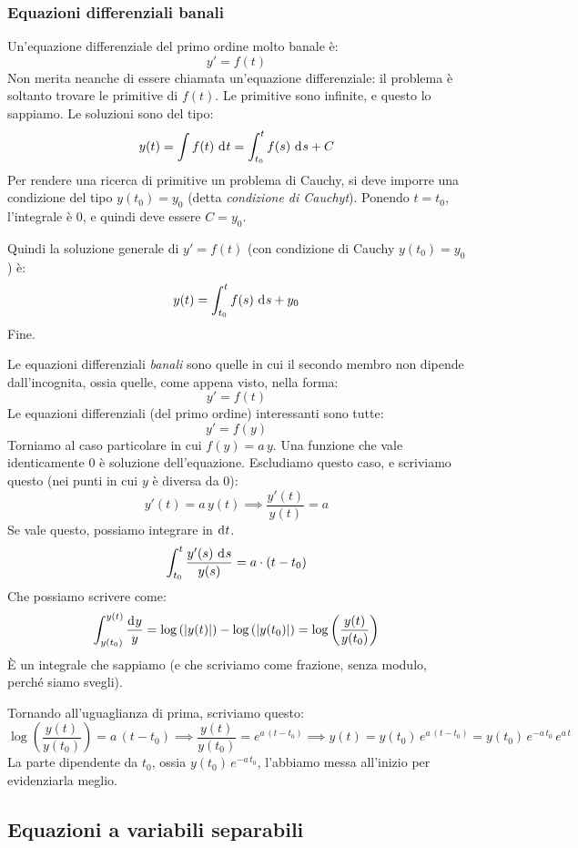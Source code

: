 
\subsubsection{Equazioni differenziali banali}

Un'equazione differenziale del primo ordine molto banale \`e:
\[
y' = f(t)
\]
Non merita neanche di essere chiamata un'equazione differenziale: il problema \`e soltanto trovare le primitive di $f(t)$. Le primitive sono infinite, e questo lo sappiamo. Le soluzioni sono del tipo:
\[
y(t) = \int f(t) \dx[t] = \int_{t_0}^{t} f(s) \dx[s] + C
\]
Per rendere una ricerca di primitive un problema di Cauchy, si deve imporre una condizione del tipo $y(t_0) = y_0$ (detta \emph{condizione di Cauchyt}). Ponendo $t = t_0$, l'integrale \`e 0, e quindi deve essere $C = y_0$. 

Quindi la soluzione generale di $y' = f(t)$ (con condizione di Cauchy $y(t_0) = y_0$) \`e:
\[
y(t) = \int_{t_0}^{t} f(s) \dx[s] + y_0
\]
Fine.

Le equazioni differenziali \emph{banali} sono quelle in cui il secondo membro non dipende dall'incognita, ossia quelle, come appena visto, nella forma:
\[
y' = f(t)
\]
Le equazioni differenziali (del primo ordine) interessanti sono tutte:
\[
y' = f(y)
\]
Torniamo al caso particolare in cui $f(y) = a \, y$. Una funzione che vale identicamente 0 \`e soluzione dell'equazione. Escludiamo questo caso, e scriviamo questo (nei punti in cui $y$ \`e diversa da 0):
\[
y'(t) = a \, y(t) \implies \frac{y'(t)}{y(t)} = a
\]
Se vale questo, possiamo integrare in $\diff t$.
\[
\int_{t_0}^{t} \frac{y'(s) \dx[s]}{y(s)} = a \cdot (t - t_0)
\]
Che possiamo scrivere come:
\[
\int_{y(t_0)}^{y(t)} \frac{\diff y}{y} =
\abslog{y(t)} - \abslog{y(t_0)} =
\log \left( \frac{y(t)}{y(t_0)} \right)
\]
\`E un integrale che sappiamo (e che scriviamo come frazione, senza modulo, perch\'e siamo svegli).

Tornando all'uguaglianza di prima, scriviamo questo:
\[
\log \left( \frac{y(t)}{y(t_0)} \right) = a \, (t - t_0) \implies
\frac{y(t)}{y(t_0)} = e^{a \, (t - t_0)} \implies
y(t) = y(t_0) \, e^{a \, (t - t_0)} = y(t_0) \, e^{- a \, t_0} \, e^{a \, t}
\]
La parte dipendente da $t_0$, ossia $y(t_0) \, e^{- a \, t_0}$, l'abbiamo messa all'inizio per evidenziarla meglio.

\subsection{Equazioni a variabili separabili}

